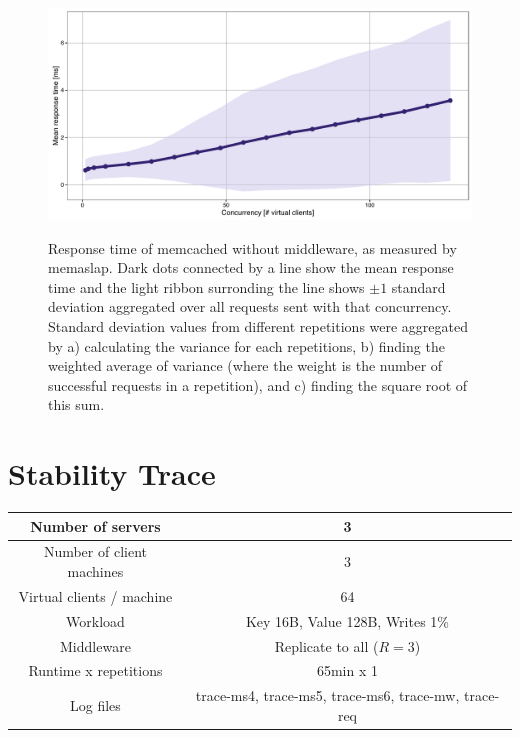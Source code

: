 \documentclass[11pt]{article}
\begin{document}
\begin{figure}[p]
\centering
\includegraphics[width=\textwidth]{../results/baseline/graphs/responsetime.pdf}
\label{fig:baseline:responsetime}
\caption{Response time of memcached without middleware, as measured by memaslap. Dark dots connected by a line show the mean response time and the light ribbon surronding the line shows $\pm 1$ standard deviation aggregated over all requests sent with that concurrency. Standard deviation values from different repetitions were aggregated by a) calculating the variance for each repetitions, b) finding the weighted average of variance (where the weight is the number of successful requests in a repetition), and c) finding the square root of this sum. }
\end{figure}

\section{Stability Trace}\label{sec:trace}

\begin{center}
\small{
\smallskip
\begin{tabular}{|c|c|}
\hline Number of servers & 3 \\ 
\hline Number of client machines & 3 \\ 
\hline Virtual clients / machine &  64 \\ 
\hline Workload & Key 16B, Value 128B, Writes 1\% \\
\hline Middleware & Replicate to all ($R=3$) \\ 
\hline Runtime x repetitions & 65min x 1 \\ 
\hline Log files & trace-ms4, trace-ms5, trace-ms6, trace-mw, trace-req \\
\hline 
\end{tabular} }
\end{center}
\end{document}
